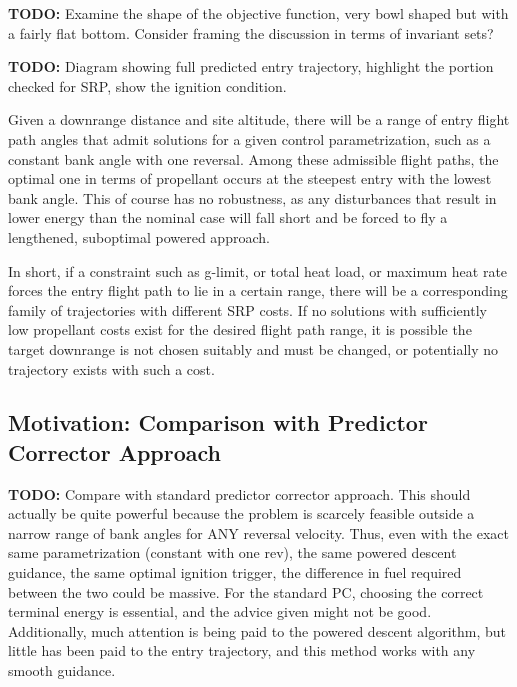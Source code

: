 \documentclass[]{article}
\begin{document}
\textbf{TODO:} Examine the shape of the objective function, very bowl shaped but with a fairly flat bottom. Consider framing the discussion in terms of invariant sets? 

\textbf{TODO:} Diagram showing full predicted entry trajectory, highlight the portion checked for SRP, show the ignition condition.

Given a downrange distance and site altitude, there will be a range of entry flight path angles that admit solutions for a given control parametrization, such as a constant bank angle with one reversal. Among these admissible flight paths, the optimal one in terms of propellant occurs at the steepest entry with the lowest bank angle. This of course has no robustness, as any disturbances that result in lower energy than the nominal case will fall short and be forced to fly a lengthened, suboptimal powered approach. 

In short, if a constraint such as g-limit, or total heat load, or maximum heat rate forces the entry flight path to lie in a certain range, there will be a corresponding family of trajectories with different SRP costs. If no solutions with sufficiently low propellant costs exist for the desired flight path range, it is possible the target downrange is not chosen suitably and must be changed, or potentially no trajectory exists with such a cost. 

\subsection{Motivation: Comparison with Predictor Corrector Approach}
\textbf{TODO:} Compare with standard predictor corrector approach. This should actually be quite powerful because the problem is scarcely feasible outside a narrow range of bank angles for ANY reversal velocity. Thus, even with the exact same parametrization (constant with one rev), the same powered descent guidance, the same optimal ignition trigger, the difference in fuel required between the two could be massive. For the standard PC, choosing the correct terminal energy is essential, and the advice given might not be good. Additionally, much attention is being paid to the powered descent algorithm, but little has been paid to the entry trajectory, and this method works with any smooth guidance.
\end{document}
